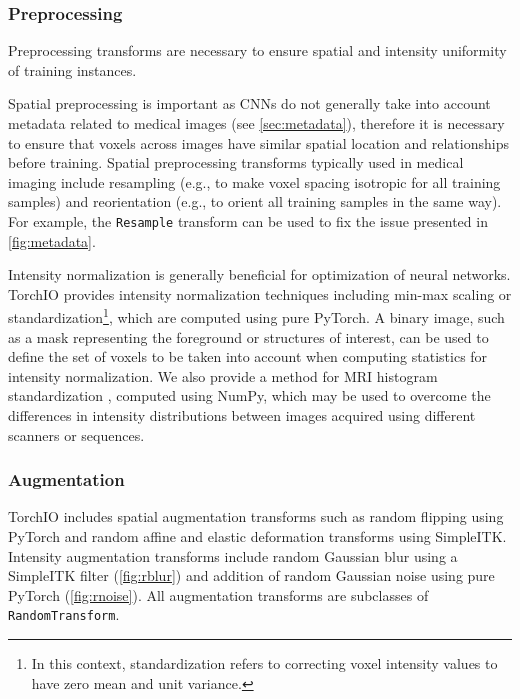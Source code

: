 

\subsubsection{Preprocessing}

Preprocessing transforms are necessary to ensure
spatial and intensity uniformity of training instances.


Spatial preprocessing is important as \acp{CNN} do not generally take into
account metadata related to medical images (see \cref{sec:metadata}),
therefore it is necessary to ensure that voxels across images have
similar spatial location and relationships before training.
%
Spatial preprocessing transforms typically used in medical imaging include
resampling (e.g., to make voxel spacing isotropic for all training samples)
and reorientation (e.g., to orient all training samples in
the same way).
%
For example, the \texttt{Resample} transform can be used to fix the issue
presented in \cref{fig:metadata}.


Intensity normalization is generally beneficial
for optimization of neural networks.
%
TorchIO provides intensity
normalization techniques including min-max scaling or
standardization\footnote{In this context,
standardization refers to correcting voxel intensity values
to have zero mean and unit variance.},
which are computed using pure PyTorch.
%
A binary image, such as a mask representing the foreground
or structures of interest,
can be used to define the set of voxels to be taken into account
when computing statistics for intensity normalization.
%
We also provide a method for \ac{MRI} histogram
standardization \cite{nyul_new_2000}, computed using NumPy,
which may be used to overcome the differences
in intensity distributions between images acquired using
different scanners or sequences.



\subsubsection{Augmentation}

TorchIO includes spatial augmentation transforms such as random flipping using
PyTorch and random affine and elastic deformation transforms using SimpleITK.
%
Intensity augmentation transforms include
random Gaussian blur using a SimpleITK filter (\cref{fig:rblur})
and addition of random Gaussian noise using pure PyTorch (\cref{fig:rnoise}).
All augmentation transforms are subclasses of \texttt{RandomTransform}.


